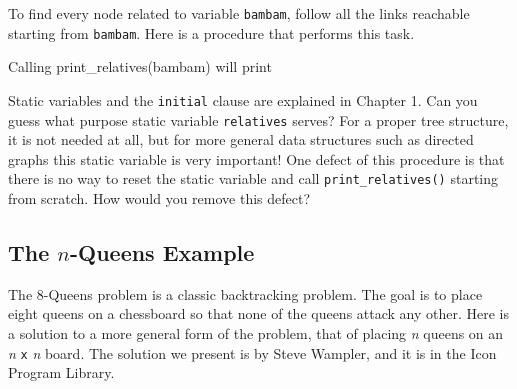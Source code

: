 \bigskip

To find every node related to variable \texttt{bambam}, follow all the
links reachable starting from \texttt{bambam}. Here is a procedure that
performs this task.


Calling print\_relatives(bambam) will print


Static variables and the \texttt{initial} clause are explained in
Chapter 1. Can you guess what purpose static variable
\texttt{relatives} serves? For a proper tree structure, it is not
needed at all, but for more general data structures such as directed
graphs this static variable is very important! One defect of this
procedure is that there is no way to reset the static variable and call
\texttt{print\_relatives()} starting from scratch. How would you remove
this defect?

\subsection*{The $n$-Queens Example}

The 8-Queens problem is a classic
backtracking problem. The goal is to place eight
queens on a chessboard so that none of the queens attack any other.
Here is a solution to a more general form of the problem, that of
placing \textit{n} queens on an \textit{n} \texttt{x}
\textit{n} board. The solution we present is by Steve Wampler, and it is in the Icon Program Library.

